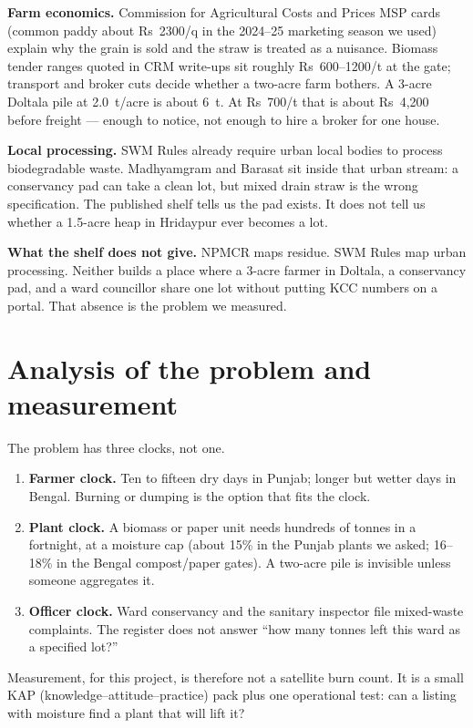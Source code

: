 \documentclass[12pt,a4paper]{article}
\begin{document}
\textbf{Farm economics.} Commission for Agricultural Costs and Prices MSP cards (common paddy about Rs~2300/q in the 2024--25 marketing season we used) explain why the grain is sold and the straw is treated as a nuisance. Biomass tender ranges quoted in CRM write-ups sit roughly Rs~600--1200/t at the gate; transport and broker cuts decide whether a two-acre farm bothers. A 3-acre Doltala pile at 2.0~t/acre is about 6~t. At Rs~700/t that is about Rs~4,200 before freight --- enough to notice, not enough to hire a broker for one house.

\textbf{Local processing.} SWM Rules already require urban local bodies to process biodegradable waste. Madhyamgram and Barasat sit inside that urban stream: a conservancy pad can take a clean lot, but mixed drain straw is the wrong specification. The published shelf tells us the pad exists. It does not tell us whether a 1.5-acre heap in Hridaypur ever becomes a lot.

\textbf{What the shelf does not give.} NPMCR maps residue. SWM Rules map urban processing. Neither builds a place where a 3-acre farmer in Doltala, a conservancy pad, and a ward councillor share one lot without putting KCC numbers on a portal. That absence is the problem we measured.

\section{Analysis of the problem and measurement}
The problem has three clocks, not one.

\begin{enumerate}
  \item \textbf{Farmer clock.} Ten to fifteen dry days in Punjab; longer but wetter days in Bengal. Burning or dumping is the option that fits the clock.
  \item \textbf{Plant clock.} A biomass or paper unit needs hundreds of tonnes in a fortnight, at a moisture cap (about 15\% in the Punjab plants we asked; 16--18\% in the Bengal compost/paper gates). A two-acre pile is invisible unless someone aggregates it.
  \item \textbf{Officer clock.} Ward conservancy and the sanitary inspector file mixed-waste complaints. The register does not answer ``how many tonnes left this ward as a specified lot?''
\end{enumerate}

Measurement, for this project, is therefore not a satellite burn count. It is a small KAP (knowledge--attitude--practice) pack plus one operational test: can a listing with moisture find a plant that will lift it?
\end{document}
